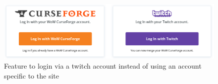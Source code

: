 \begin{figure}[h]
	\begin{center}
		\includegraphics[width=0.8\linewidth]{sections/figures/login-via-twitch}
	\end{center}
\caption{Feature to login via a twitch account instead of using an account specific to the site~\cite{login-via-twitch}}\label{fig:login-via-twitch}
\end{figure}
